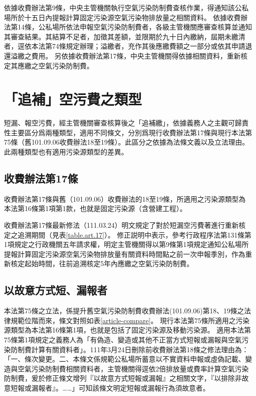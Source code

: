 \documentclass[11pt,a4paper]{article}
\begin{document}
依據收費辦法第9條，中央主管機關執行空氣污染防制費查核作業，得通知該公私場所於十五日內提報計算固定污染源空氣污染物排放量之相關資料。
依據收費辦法第14條，公私場所依法申報空氣污染防制費者，各級主管機關應審查核算並通知其審查結果。其結算不足者，加徵其差額，並限期於九十日內繳納，屆期未繳清者，逕依本法第74條規定辦理；溢繳者，充作其後應繳費額之一部分或依其申請退還溢繳之費用。
另依據收費辦法第17條，中央主管機關得依據相關資料，重新核定其應繳之空氣污染防制費。


\section{「追補」空污費之類型}

短漏、報空污費，經主管機關審查核算後之「追補繳」，依據義務人之主觀可歸責性主要區分爲兩種類型，適用不同條文，分別爲現行收費辦法第17條與現行本法第75條（舊101.09.06收費辦法18至19條）。此區分之依據為法條文義以及立法理由。此兩種類型也有適用污染源類型的差異。

\subsection{收費辦法第17條}

收費辦法第17條與舊（101.09.06）收費辦法的18至19條，所適用之污染源類型為本法第16條第1項第1款，也就是固定污染源（含營建工程）。

收費辦法第17條最新修法（111.03.24）明文規定了對於短漏空污費著進行重新核定之追溯期間（見表\ref{table.art.17}）。
修正説明中表示，參考行政程序法第131條第1項規定之行政機關五年請求權，明定主管機關得以第9條第1項規定通知公私場所提報計算固定污染源空氣污染物排放量有關資料時間點之前一次申報季別，作為重新核定起始時間，往前追溯核定5年內應繳之空氣污染防制費。


\subsection{以故意方式短、漏報者}

本法第75條之立法，係提升舊空氣污染防制費收費辦法(101.09.06)第18、19條之法律規範位階而來，條文對照如表\ref{article-compare}。
現行本法第75條所適用之污染源類型為本法第16條第1項，也就是包括了固定污染源及移動污染源。
適用本法第75條第1項規定之義務人為「有偽造、變造或其他不正當方式短報或漏報與空氣污染防制費計算有關資料者」。111年3月24日刪除前收費辦法第18條之修法理由為：「一、條次變更。二、本條文係規範公私場所蓄意以不實資料申報或虛偽記載、變造與空氣污染防制費相關資料者，主管機關得逕依2倍排放量或費率計算空氣污染防制費，爰於修正條文增列『以故意方式短報或漏報』之相關文字，『以排除非故意短報或漏報者』。……」可知該條文明定短報或漏報行為須故意者。
\end{document}
